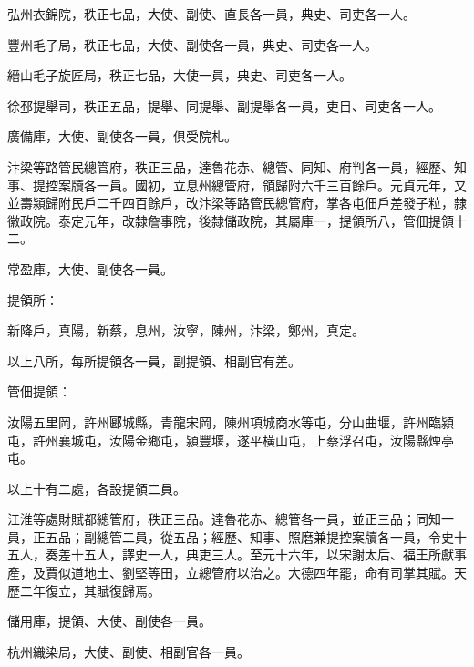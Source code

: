 \begin{pinyinscope}
 弘州衣錦院，秩正七品，大使、副使、直長各一員，典史、司吏各一人。



 豐州毛子局，秩正七品，大使、副使各一員，典史、司吏各一人。



 縉山毛子旋匠局，秩正七品，大使一員，典史、司吏各一人。



 徐邳提舉司，秩正五品，提舉、同提舉、副提舉各一員，吏目、司吏各一人。



 廣備庫，大使、副使各一員，俱受院札。



 汴梁等路管民總管府，秩正三品，達魯花赤、總管、同知、府判各一員，經歷、知事、提控案牘各一員。國初，立息州總管府，領歸附六千三百餘戶。元貞元年，又並壽潁歸附民戶二千四百餘戶，改汴梁等路管民總管府，掌各屯佃戶差發子粒，隸徽政院。泰定元年，改隸詹事院，後隸儲政院，其屬庫一，提領所八，管佃提領十二。



 常盈庫，大使、副使各一員。



 提領所：



 新降戶，真陽，新蔡，息州，汝寧，陳州，汴梁，鄭州，真定。



 以上八所，每所提領各一員，副提領、相副官有差。



 管佃提領：



 汝陽五里岡，許州郾城縣，青龍宋岡，陳州項城商水等屯，分山曲堰，許州臨潁屯，許州襄城屯，汝陽金鄉屯，潁豐堰，遂平橫山屯，上蔡浮召屯，汝陽縣煙亭屯。



 以上十有二處，各設提領二員。



 江淮等處財賦都總管府，秩正三品。達魯花赤、總管各一員，並正三品；同知一員，正五品；副總管二員，從五品；經歷、知事、照磨兼提控案牘各一員，令史十五人，奏差十五人，譯史一人，典吏三人。至元十六年，以宋謝太后、福王所獻事產，及賈似道地土、劉堅等田，立總管府以治之。大德四年罷，命有司掌其賦。天歷二年復立，其賦復歸焉。



 儲用庫，提領、大使、副使各一員。



 杭州織染局，大使、副使、相副官各一員。




\end{pinyinscope}
